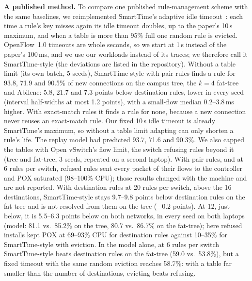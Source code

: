 \documentclass[sigconf]{acmart}
\begin{document}
\textbf{A published method.} To compare one published rule-management scheme with the same baselines, we reimplemented SmartTime's adaptive idle timeout~\cite{smarttime}: each time a rule's key misses again its idle timeout doubles, up to the paper's 10\,s maximum, and when a table is more than 95\% full one random rule is evicted. OpenFlow~1.0 timeouts are whole seconds, so we start at 1\,s instead of the paper's 100\,ms, and we use our workloads instead of its traces; we therefore call it SmartTime-style (the deviations are listed in the repository). Without a table limit (its own batch, 5 seeds), SmartTime-style with pair rules finds a rule for 93.8, 71.9 and 90.5\% of new connections on the campus tree, the $k{=}4$ fat-tree and Abilene: 5.8, 21.7 and 7.3 points below destination rules, lower in every seed (interval half-widths at most 1.2 points), with a small-flow median 0.2--3.8\,ms higher. With exact-match rules it finds a rule for none, because a new connection never reuses an exact-match rule. Our fixed 10\,s idle timeout is already SmartTime's maximum, so without a table limit adapting can only shorten a rule's life. The replay model had predicted 93.7, 71.6 and 90.3\%. We also capped the tables with Open vSwitch's flow limit, the switch refusing rules beyond it (tree and fat-tree, 3 seeds, repeated on a second laptop). With pair rules, and at 6 rules per switch, refused rules sent every packet of their flows to the controller and POX saturated (98--100\% CPU); those results changed with the machine and are not reported. With destination rules at 20 rules per switch, above the 16 destinations, SmartTime-style stays 9.7--9.8 points below destination rules on the fat-tree and is not resolved from them on the tree ($-0.2$ points). At 12, just below, it is 5.5--6.3 points below on both networks, in every seed on both laptops (model: 81.1 vs.\ 85.2\% on the tree, 80.7 vs.\ 86.7\% on the fat-tree); here refused installs kept POX at 69--93\% CPU for destination rules against 10--35\% for SmartTime-style with eviction. In the model alone, at 6 rules per switch SmartTime-style beats destination rules on the fat-tree (59.0 vs.\ 53.8\%), but a fixed timeout with the same random eviction reaches 58.7\%: with a table far smaller than the number of destinations, evicting beats refusing.
\end{document}
